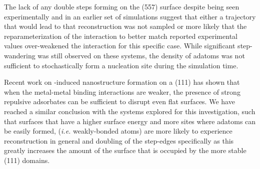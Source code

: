 The lack of any double steps forming on the (557) surface despite being seen
experimentally and in an earlier set of simulations suggest that either a
trajectory that would lead to that reconstruction was not sampled or more
likely that the reparameterization of the  interaction to
better match reported experimental values over-weakened the interaction for
this specific case. While significant step-wandering was still observed on
these systems, the density of adatoms was not sufficient to stochastically form
a nucleation site during the simulation time.

Recent work on -induced nanostructure formation on a  (111) has
shown that when the metal-metal binding interactions are weaker, the presence
of strong repulsive adsorbates can be sufficient to disrupt even flat
surfaces.\citep{Eren:2016qt} We have reached a similar conclusion with the  systems
explored for this investigation, such that surfaces that have a higher surface
energy and more sites where adatoms can be easily formed, ({\em i.e.}
weakly-bonded atoms) are more likely to experience reconstruction in general
and doubling of the step-edges specifically as this greatly increases the
amount of the surface that is occupied by the more stable (111) domains.

